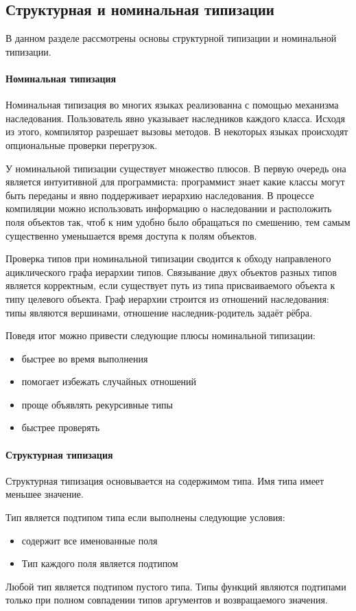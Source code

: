 \subsection{Структурная и номинальная типизации}
В данном разделе рассмотрены основы структурной типизации и номинальной типизации.

\paragraph{Номинальная типизация}
Номинальная типизация во многих языках реализованна с помощью механизма наследования\cite{book:pierce}. Пользователь явно указывает наследников каждого класса. Исходя из этого, компилятор разрешает вызовы методов. В некоторых языках происходят опциональные проверки перегрузок.

У номинальной типизации существует множество плюсов. В первую очередь она является интуитивной для программиста: программист знает какие классы могут быть переданы и явно поддерживает иерархию наследования. В процессе компиляции можно использовать информацию о наследовании и расположить поля объектов так, чтоб к ним удобно было обращаться по смешению, тем самым существенно уменьшается время доступа к полям объектов.

Проверка типов при номинальной типизации сводится к обходу направленого ациклического графа иерархии типов. Связывание двух объектов разных типов является корректным, если существует путь из типа присваиваемого объекта к типу целевого объекта. Граф иерархии строится из отношений наследования: типы являются вершинами, отношение наследник-родитель задаёт рёбра.

Поведя итог можно привести следующие плюсы номинальной типизации:
\begin{itemize}
    \item быстрее во время выполнения
    \item помогает избежать случайных отношений
    \item проще объявлять рекурсивные типы
    \item быстрее проверять
\end{itemize}

\paragraph{Структурная типизация}
Структурная типизация основывается на содержимом типа\cite{book:pierce}. Имя типа имеет меньшее значение.

Тип  является подтипом типа  если выполнены следующие условия:
\begin{itemize}
    \item {} содержит все именованные поля 
    \item Тип каждого поля  является подтипом 
\end{itemize}
Любой тип является подтипом пустого типа. Типы функций являются подтипами только при полном совпадении типов аргументов и возвращаемого значения.

